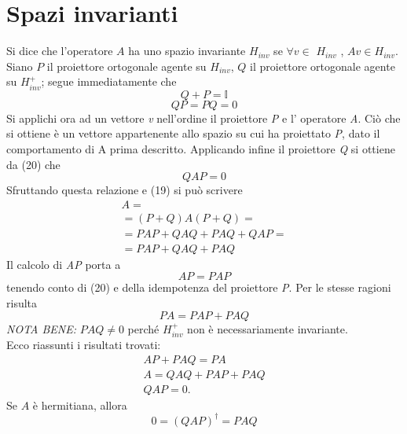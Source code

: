 \section{Spazi invarianti} %
Si dice che l'operatore $A$ ha uno spazio invariante $H_{inv}$ se $\forall v\in$ $H_{inv}$ , $Av\in H_{inv}$. 
Siano $P$ il proiettore ortogonale agente su $H_{inv}$,
 $Q$ il proiettore ortogonale agente su $H_{inv} ^{+}$; segue immediatamente che 
 \begin{equation}
Q+P=\mathbb{I}
 \end{equation}
\begin{equation}
QP=PQ=0 
 \end{equation}
Si applichi ora ad un vettore \textit{v} nell'ordine il proiettore \textit{P} e l' operatore \textit{A}. Ciò che si ottiene è un vettore appartenente allo spazio su cui ha proiettato \textit{P}, dato il comportamento di A prima descritto. Applicando infine il proiettore \textit{Q} si ottiene da (20) che \\
 \begin{equation}
QAP=0
 \end{equation}
Sfruttando questa relazione e (19) si può scrivere 
 \begin{equation}\begin{split}
A=\\
=(P+Q)A(P+Q)=\\
=PAP+QAQ+PAQ+QAP=\\
=PAP+QAQ+PAQ
 \end{split}\end{equation}
Il calcolo di \textit{AP} porta a 
 \begin{equation}
AP=PAP
 \end{equation}
tenendo conto di (20) e della idempotenza del proiettore \textit{P}.
Per le stesse ragioni risulta
 \begin{equation}
PA=PAP+PAQ
 \end{equation}
\textit{NOTA BENE:} $PAQ \neq 0$ perché $H_{inv} ^{+}$ non è necessariamente invariante.\\
Ecco riassunti i risultati trovati:
 \begin{equation*}\begin{split}
AP+PAQ=PA\\
A=QAQ+PAP+PAQ\\
QAP=0.
 \end{split}\end{equation*}
Se $A$ è hermitiana, allora
 \begin{equation}
0=\left(QAP\right)^{\dag}=PAQ
 \end{equation}
